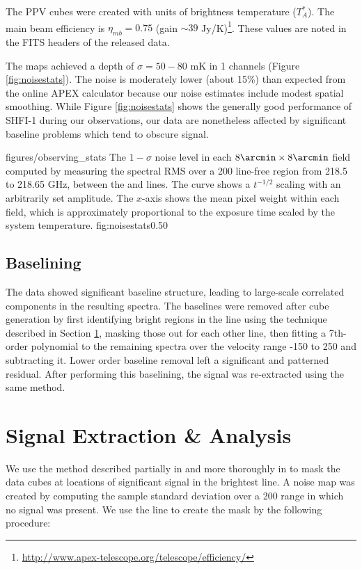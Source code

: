 
The PPV cubes were created with units of brightness temperature ($T_A^*$).  The
main beam efficiency is $\eta_{mb} = 0.75$ (gain $\sim39$
Jy/K)\footnote{\url{http://www.apex-telescope.org/telescope/efficiency/}}.
These values are noted in the FITS headers of the released data.

The maps achieved a depth of $\sigma=50-80$ mK in 1 \kms channels (Figure
\ref{fig:noisestats}).  The noise is moderately lower (about 15\%) than
expected from the online APEX calculator because our noise estimates include
modest spatial smoothing.  While Figure \ref{fig:noisestats} shows the
generally good performance of SHFI-1 during our observations, our data are
nonetheless affected by significant baseline problems which tend to obscure
signal.

\Figure
{figures/observing_stats}
{The $1-\sigma$ noise level in each $8\arcmin\times8\arcmin$ field
computed by measuring the spectral RMS over a 200 \kms line-free region
from 218.5 to 218.65 GHz, between the \threetwoone and \threetwotwo lines.
The curve shows a $t^{-1/2}$ scaling with an arbitrarily set amplitude.  The
$x$-axis shows the mean pixel weight within each field, which is approximately
proportional to the exposure time scaled by the system temperature.}
{fig:noisestats}{0.5}{0}


\subsection{Baselining}
\label{sec:baseline}
The data showed significant baseline structure, leading to large-scale
correlated components in the resulting spectra.  The baselines were removed
after cube generation by first identifying bright regions in the \para
\threeohthree line using the technique described in Section \ref{sec:signal},
masking those out for each other line, then fitting a 7th-order polynomial to
the remaining spectra over the velocity range -150 to 250 \kms and subtracting
it.  Lower order baseline removal left a significant and patterned residual.
After performing this baselining, the signal was re-extracted using the same
method.

\section{Signal Extraction \& Analysis}
\label{sec:signal}
We use the method described partially in \citet{Ao2013a} and more thoroughly in
\citet{Dame2011b} to mask the data cubes at locations of significant signal in 
the brightest line. 
A noise map was created by computing the sample standard deviation over a
200 \kms range in which no signal was present.
We use the \para \threeohthree line to create the mask by
the following procedure:

